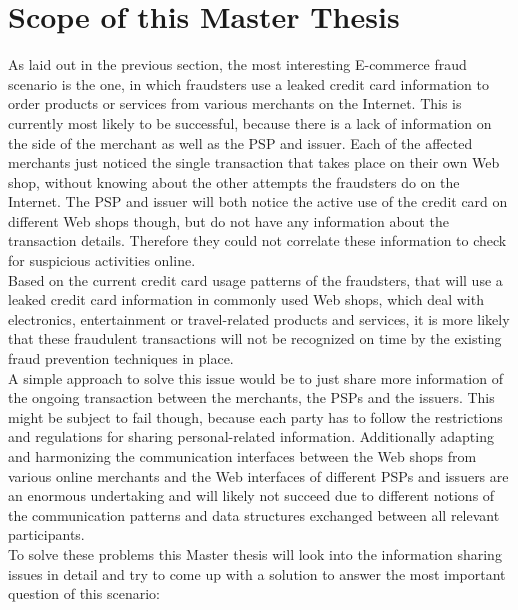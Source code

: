 
\section{Scope of this Master Thesis}
\label{sec:scope_thesis}

As laid out in the previous section, the most interesting \gls{E-commerce} fraud scenario is the one, in which fraudsters use a leaked credit card information to order products or services from various merchants on the Internet. This is currently most likely to be successful, because there is a lack of information on the side of the merchant as well as the \gls{PSP} and issuer. Each of the affected merchants just noticed the single transaction that takes place on their own Web shop, without knowing about the other attempts the fraudsters do on the Internet. The \gls{PSP} and issuer will both notice the active use of the credit card on different Web shops though, but do not have any information about the transaction details. Therefore they could not correlate these information to check for suspicious activities online. \\

Based on the current credit card usage patterns of the fraudsters, that will use a leaked credit card information in commonly used Web shops, which deal with electronics, entertainment or travel-related products and services, it is more likely that these fraudulent transactions will not be recognized on time by the existing fraud prevention techniques in place. \\

A simple approach to solve this issue would be to just share more information of the ongoing transaction between the merchants, the \gls{PSP}s and the issuers. This might be subject to fail though, because each party has to follow the restrictions and regulations for sharing personal-related information. Additionally adapting and harmonizing the communication interfaces between the Web shops from various online merchants and the Web interfaces of different \gls{PSP}s and issuers are an enormous undertaking and will likely not succeed due to different notions of the communication patterns and data structures exchanged between all relevant participants. \\

To solve these problems this Master thesis will look into the information sharing issues in detail and try to come up with a solution to answer the most important question of this scenario: \@

